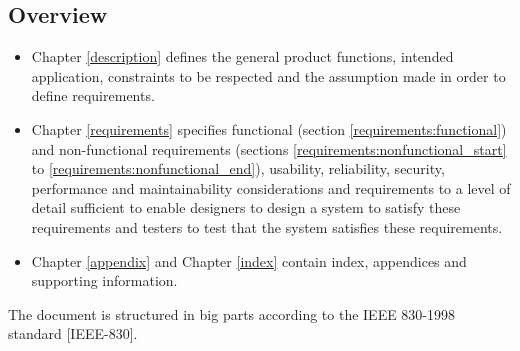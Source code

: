 \begin{reference_table}
\end{reference_table}


\subsection{Overview}
\label{intro:overview}
\begin{itemize}
  \item Chapter \ref{description} defines the general product functions, intended application, constraints to be respected and the assumption made in order to define requirements.
  \item Chapter \ref{requirements} specifies functional (section \ref{requirements:functional}) and non-functional requirements (sections \ref{requirements:nonfunctional_start} to \ref{requirements:nonfunctional_end}), usability, reliability, security, performance and maintainability considerations and requirements to a level of detail sufficient to enable designers to design a system to satisfy these requirements and testers to test that the system satisfies these requirements. %
  \item Chapter \ref{appendix} and Chapter \ref{index} contain index, appendices and supporting information.
\end{itemize}
The document is structured in big parts according to the IEEE 830-1998 standard [IEEE-830].
